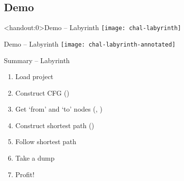 \documentclass[xcolor={dvipsnames}]{beamer}
\begin{document}
\subsection{Demo}
\begin{frame}<handout:0>{Demo -- Labyrinth}
    \centering
    \texttt{[image: chal-labyrinth]}
\end{frame}
\begin{frame}[noframenumbering]{Demo -- Labyrinth}
    \centering
    \texttt{[image: chal-labyrinth-annotated]}
\end{frame}
\begin{frame}{Summary -- Labyrinth}
    \begin{enumerate}
        \item<1-> Load project
        \item<2-> Construct CFG ()
        \item<3-> Get `from' and `to' nodes (, )
        \item<3-> Construct shortest path ()
        \item<3-> Follow shortest path
        \item<4-> Take a dump
        \item<4-> Profit!
    \end{enumerate}
\end{frame}
\end{document}
